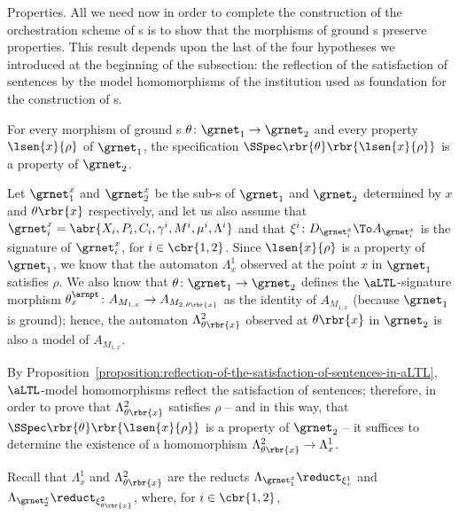 \documentclass{LMCS}
\begin{document}
\begin{minisection}{Properties.}
    All we need now in order to complete the construction of the orchestration scheme of s is to show that the morphisms of ground s preserve properties.
    This result depends upon the last of the four hypotheses we introduced at the beginning of the subsection: the reflection of the satisfaction of sentences by the model homomorphisms of the institution used as foundation for the construction of s.

    \begin{prop}
      \label{orchestration-scheme-of-ARNs}
      For every morphism of ground s \(\theta \colon \grnet_{1} \to \grnet_{2}\) and every property \(\lsen{x}{\rho}\) of \(\grnet_{1}\), the specification \(\SSpec\rbr{\theta}\rbr{\lsen{x}{\rho}}\) is a property of \(\grnet_{2}\).
    \end{prop}

    \proof
    Let \(\grnet_{1}^{x}\) and \(\grnet_{2}^{x}\) be the sub-s of \(\grnet_{1}\) and \(\grnet_{2}\) determined by \(x\) and \(\theta\rbr{x}\) respectively, and let us also assume that \(\grnet_{i}^{x} = \abr{X_{i}, P_{i}, C_{i}, \gamma^{i}, M^{i}, \mu^{i}, \Lambda^{i}}\) and that \(\xi^{i} \colon D_{\grnet_{i}^{x}} \To A_{\grnet_{i}^{x}}\) is the signature of \(\grnet_{i}^{x}\), for \(i \in \cbr{1, 2}\).
    Since \(\lsen{x}{\rho}\) is a property of \(\grnet_{1}\), we know that the automaton \(\Lambda^{1}_{x}\) observed at the point \(x\) in \(\grnet_{1}\) satisfies \(\rho\).
    We also know that \(\theta \colon \grnet_{1} \to \grnet_{2}\) defines the \(\aLTL\)\nb-signature morphism \(\theta^{\arnpt}_{x} \colon A_{M_{1, x}} \to A_{M_{2, \theta\rbr{x}}}\) as the identity of \(A_{M_{1, x}}\) (because \(\grnet_{1}\) is ground); hence, the automaton \(\Lambda^{2}_{\theta\rbr{x}}\) observed at \(\theta\rbr{x}\) in \(\grnet_{2}\) is also a model of \(A_{M_{1, x}}\).

    By Proposition~\ref{proposition:reflection-of-the-satisfaction-of-sentences-in-aLTL}, \(\aLTL\)\nb-model homomorphisms reflect the satisfaction of sentences; therefore, in order to prove that \(\Lambda^{2}_{\theta\rbr{x}}\) satisfies \(\rho\) -- and in this way, that \(\SSpec\rbr{\theta}\rbr{\lsen{x}{\rho}}\) is a property of \(\grnet_{2}\) -- it suffices to determine the existence of a homomorphism \(\Lambda^{2}_{\theta\rbr{x}} \to \Lambda^{1}_{x}\).

    Recall that \(\Lambda^{1}_{x}\) and \(\Lambda^{2}_{\theta\rbr{x}}\) are the reducts \(\Lambda_{\grnet_{1}^{x}} \reduct_{\xi^{1}_{x}}\) and \(\Lambda_{\grnet_{2}^{x}} \reduct_{\xi^{2}_{\theta\rbr{x}}}\), where, for \(i \in \cbr{1, 2}\),
    \begin{itemize}
      

\end{itemize}
\end{minisection}
\end{document}
